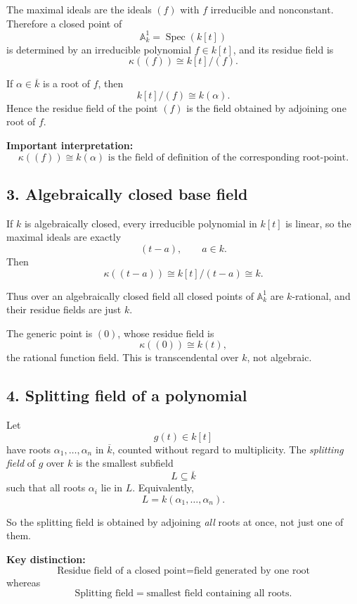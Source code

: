 \documentclass[12pt,a4paper]{article}
\theoremstyle{plain}
\theoremstyle{definition}      %
\begin{document}
The maximal ideals are the ideals \((f)\) with \(f\) irreducible and nonconstant. Therefore a closed point of
\[
\mathbb A^1_k=\operatorname{Spec}(k[t])
\]
is determined by an irreducible polynomial \(f\in k[t]\), and its residue field is
\[
\kappa((f))\cong k[t]/(f).
\]

If \(\alpha\in \overline{k}\) is a root of \(f\), then
\[
k[t]/(f)\cong k(\alpha).
\]
Hence the residue field of the point \((f)\) is the field obtained by adjoining one root of \(f\).

\medskip

\textbf{Important interpretation:}
\[
\boxed{\kappa((f))\cong k(\alpha)\text{ is the field of definition of the corresponding root-point.}}
\]

\subsection*{3. Algebraically closed base field}

If \(k\) is algebraically closed, every irreducible polynomial in \(k[t]\) is linear, so the maximal ideals are exactly
\[
(t-a),\qquad a\in k.
\]
Then
\[
\kappa((t-a))\cong k[t]/(t-a)\cong k.
\]

Thus over an algebraically closed field all closed points of \(\mathbb A^1_k\) are \(k\)-rational, and their residue fields are just \(k\).

The generic point is \((0)\), whose residue field is
\[
\kappa((0))\cong k(t),
\]
the rational function field. This is transcendental over \(k\), not algebraic.

\subsection*{4. Splitting field of a polynomial}

Let
\[
g(t)\in k[t]
\]
have roots \(\alpha_1,\dots,\alpha_n\) in \(\overline{k}\), counted without regard to multiplicity. The \emph{splitting field} of \(g\) over \(k\) is the smallest subfield
\[
L\subseteq \overline{k}
\]
such that all roots \(\alpha_i\) lie in \(L\). Equivalently,
\[
L=k(\alpha_1,\dots,\alpha_n).
\]

So the splitting field is obtained by adjoining \emph{all} roots at once, not just one of them.

\medskip

\textbf{Key distinction:}
\[
\boxed{\text{Residue field of a closed point} = \text{field generated by one root}}
\]
whereas
\[
\boxed{\text{Splitting field} = \text{smallest field containing all roots}.}
\]
\end{document}
